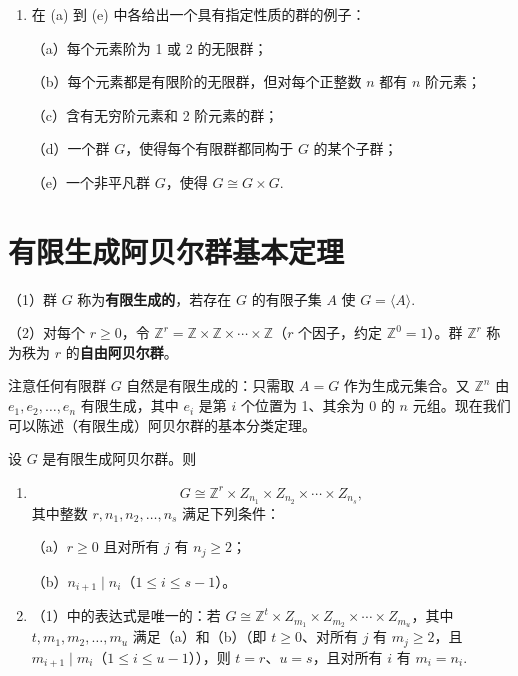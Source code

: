 \begin{enumerate}
（a）证明受限直积是直积的子群。

（b）证明受限直积在直积中正规。

（c）设 \(I = \mathbb{Z}^+\)，\(p_i\) 是第 \(i\) 个素数。证明：若对所有 \(i \in \mathbb{Z}^+\) 有 \(G_i = \mathbb{Z}/p_i\mathbb{Z}\)，则受限直积的每个元素都是有限阶的，而 \(\prod_{i \in \mathbb{Z}^+} G_i\) 有无穷阶元素。证明在这个例子中受限直积是直积的挠子群（参见第 2.1 节习题 6）。

\item 在 (a) 到 (e) 中各给出一个具有指定性质的群的例子：

（a）每个元素阶为 1 或 2 的无限群；

（b）每个元素都是有限阶的无限群，但对每个正整数 \(n\) 都有 \(n\) 阶元素；

（c）含有无穷阶元素和 2 阶元素的群；

（d）一个群 \(G\)，使得每个有限群都同构于 \(G\) 的某个子群；

（e）一个非平凡群 \(G\)，使得 \(G \cong G \times G\).
\end{enumerate}

\section{有限生成阿贝尔群基本定理}

\begin{definition}
（1）群 \(G\) 称为\textbf{有限生成的}，若存在 \(G\) 的有限子集 \(A\) 使 \(G = \langle A \rangle\).

（2）对每个 \(r \geq 0\)，令 \(\mathbb{Z}^r = \mathbb{Z} \times \mathbb{Z} \times \cdots \times \mathbb{Z}\)（\(r\) 个因子，约定 \(\mathbb{Z}^0 = 1\)）。群 \(\mathbb{Z}^r\) 称为秩为 \(r\) 的\textbf{自由阿贝尔群}。
\end{definition}

注意任何有限群 \(G\) 自然是有限生成的：只需取 \(A = G\) 作为生成元集合。又 \(\mathbb{Z}^n\) 由 \(e_1, e_2, \ldots, e_n\) 有限生成，其中 \(e_i\) 是第 \(i\) 个位置为 1、其余为 0 的 \(n\) 元组。现在我们可以陈述（有限生成）阿贝尔群的基本分类定理。

\begin{theorem}[有限生成阿贝尔群基本定理]\label{thm:5.3}
设 \(G\) 是有限生成阿贝尔群。则

\begin{enumerate}[label=(\arabic*)]
\item
\[
G \cong \mathbb{Z}^r \times Z_{n_1} \times Z_{n_2} \times \cdots \times Z_{n_s},
\]
其中整数 \(r, n_1, n_2, \ldots, n_s\) 满足下列条件：

（a）\(r \geq 0\) 且对所有 \(j\) 有 \(n_j \geq 2\)；

（b）\(n_{i+1} \mid n_i\)（\(1 \leq i \leq s-1\)）。

\item （1）中的表达式是唯一的：若 \(G \cong \mathbb{Z}^t \times Z_{m_1} \times Z_{m_2} \times \cdots \times Z_{m_u}\)，其中 \(t, m_1, m_2, \ldots, m_u\) 满足（a）和（b）（即 \(t \geq 0\)、对所有 \(j\) 有 \(m_j \geq 2\)，且 \(m_{i+1} \mid m_i\)（\(1 \leq i \leq u-1\)）），则 \(t = r\)、\(u = s\)，且对所有 \(i\) 有 \(m_i = n_i\).
\end{enumerate}
\end{theorem}

